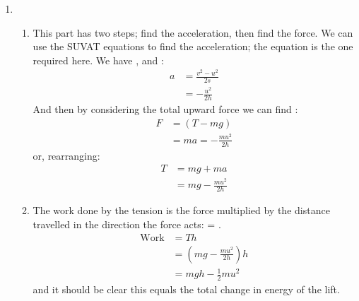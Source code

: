 \begin{problem}[HE+_Lift]
{\begin{enumerate}
\begin{enumerate}
\begin{align*}
&= mg + \frac{mu^{2}}{2h} 
\end{align*}
	\item The work done by the tension is the force multiplied by the distance travelled in the direction the force acts:  =  (as the tension acts in the opposite direction to the distance).
	\begin{align*} 
	\textrm{Work} &= -Th \\
	&= -\left(mg + \frac{mu^{2}}{2h}\right)h \\ 
	&= - mgh - \frac{1}{2}mu^{2} 
	\end{align*}
and it should be clear this equals the total change in energy of the lift.
\end{enumerate}
\item 
\begin{enumerate} 
\item This part has two steps; find the acceleration, then find the force. We can use the SUVAT equations to find the acceleration; the equation  is the one required here. We have , \value{u}{u}{} and \value{s}{h}{}:
\begin{align*} 
a &= \frac{v^{2} - u^{2}}{2s} \\ 
&= -\frac{u^{2}}{2h} 
\end{align*}
And then by considering the total upward force we can find :
\begin{align*} 
F &= (T - mg) \\ 
&= ma = -\frac{mu^{2}}{2h} 
\end{align*}
or, rearranging:
\begin{align*} 
T &= mg + ma \\ 
&= mg - \frac{mu^{2}}{2h} 
\end{align*}
	\item The work done by the tension is the force multiplied by the distance travelled in the direction the force acts:  = .
	\begin{align*} 
	\text{Work} &= Th \\
	&= \left(mg - \frac{mu^{2}}{2h}\right)h \\ 
	&= mgh - \frac{1}{2}mu^{2} 
	\end{align*}
and it should be clear this equals the total change in energy of the lift. 
\end{enumerate}
\end{enumerate}}
\end{problem}